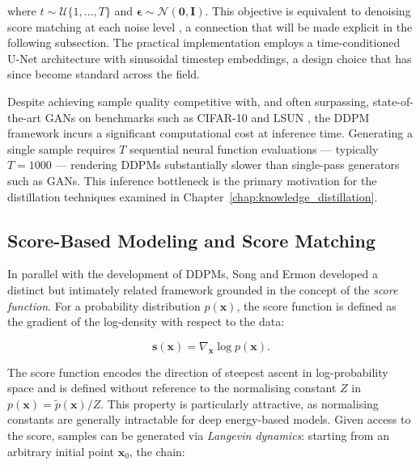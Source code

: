 \noindent where $t \sim \mathcal{U}\{1, \ldots, T\}$ and
$\boldsymbol{\epsilon} \sim \mathcal{N}(\mathbf{0}, \mathbf{I})$.
This objective is equivalent to denoising score matching at each noise level
\cite{vincent2011connection}, a connection that will be made explicit in the
following subsection. The practical implementation employs a time-conditioned
U-Net architecture \cite{ronneberger2015unet} with sinusoidal timestep
embeddings, a design choice that has since become standard across the field.

Despite achieving sample quality competitive with, and often surpassing, state-of-the-art
GANs on benchmarks such as CIFAR-10 and LSUN \cite{ho2020denoising}, the DDPM
framework incurs a significant computational cost at inference time. Generating
a single sample requires $T$ sequential neural function evaluations — typically
$T = 1000$ — rendering DDPMs substantially slower than single-pass generators
such as GANs. This inference bottleneck is the primary motivation for the
distillation techniques examined in Chapter~\ref{chap:knowledge_distillation}.


\subsection{Score-Based Modeling and Score Matching}
\label{subsec:score_matching}

In parallel with the development of DDPMs, Song and Ermon
\cite{song2019generative, song2020improved} developed a distinct but intimately
related framework grounded in the concept of the \emph{score function}.
For a probability distribution $p(\mathbf{x})$, the score function is defined
as the gradient of the log-density with respect to the data:

\begin{equation}
    \mathbf{s}(\mathbf{x}) = \nabla_{\mathbf{x}} \log p(\mathbf{x}).
    \label{eq:score_function}
\end{equation}

The score function encodes the direction of steepest ascent in log-probability
space and is defined without reference to the normalising constant $Z$ in
$p(\mathbf{x}) = \tilde{p}(\mathbf{x}) / Z$. This property is particularly
attractive, as normalising constants are generally intractable for deep energy-based
models. Given access to the score, samples can be generated via
\emph{Langevin dynamics}: starting from an arbitrary initial point
$\mathbf{x}_0$, the chain:

